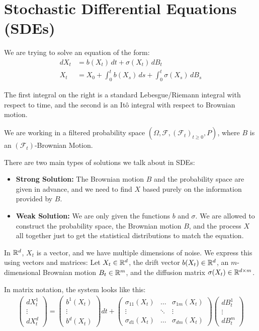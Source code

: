 \section{Stochastic Differential Equations (SDEs)}

We are trying to solve an equation of the form:
\begin{align}
    dX_t &= b(X_t) \, dt + \sigma(X_t) \, dB_t \\
    X_t &= X_0 + \int_0^t b(X_s) \, ds + \int_0^t \sigma(X_s) \, dB_s
\end{align}

The first integral on the right is a standard Lebesgue/Riemann integral with respect to time, and the second is an Itô integral with respect to Brownian motion.

We are working in a filtered probability space $(\Omega, \mathcal{F}, (\mathcal{F}_t)_{t \ge 0}, P)$, where $B$ is an $(\mathcal{F}_t)$-Brownian Motion. 

There are two main types of solutions we talk about in SDEs:
\begin{itemize}
    \item \textbf{Strong Solution:} The Brownian motion $B$ and the probability space are given in advance, and we need to find $X$ based purely on the information provided by $B$.
    \item \textbf{Weak Solution:} We are only given the functions $b$ and $\sigma$. We are allowed to construct the probability space, the Brownian motion $B$, and the process $X$ all together just to get the statistical distributions to match the equation.
\end{itemize}

In $\mathbb{R}^d$, $X_t$ is a vector, and we have multiple dimensions of noise. We express this using vectors and matrices:
Let $X_t \in \mathbb{R}^d$, the drift vector $b(X_t) \in \mathbb{R}^d$, an $m$-dimensional Brownian motion $B_t \in \mathbb{R}^m$, and the diffusion matrix $\sigma(X_t) \in \mathbb{R}^{d \times m}$. 

In matrix notation, the system looks like this:
\begin{align*}
    \begin{pmatrix}
    dX_t^1 \\ \vdots \\ dX_t^d
    \end{pmatrix}
    =
    \begin{pmatrix}
    b^1(X_t) \\ \vdots \\ b^d(X_t)
    \end{pmatrix} dt
    +
    \begin{pmatrix}
    \sigma_{11}(X_t) & \dots & \sigma_{1m}(X_t) \\
    \vdots & \ddots & \vdots \\
    \sigma_{d1}(X_t) & \dots & \sigma_{dm}(X_t)
    \end{pmatrix}
    \begin{pmatrix}
    dB_t^1 \\ \vdots \\ dB_t^m
    \end{pmatrix}
\end{align*}

